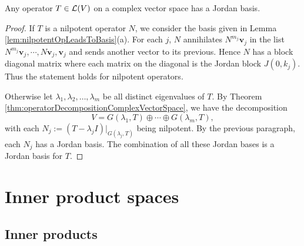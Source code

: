 \begin{thm}[Jordan]
  \label{thm:JordanBasis}
  Any operator $T\in{\cal L}(V)$ on a complex vector space
  has a Jordan basis.
\end{thm}
\begin{proof}
  If $T$ is a nilpotent operator $N$,
  we consider the basis given in
  Lemma \ref{lem:nilpotentOpLeadsToBasis}(a).
  For each $j$, $N$ annihilates
  $N^{m_j}\mathbf{v}_j$ in the list
  $N^{m_j}\mathbf{v}_j, \cdots, N\mathbf{v}_j, \mathbf{v}_j$
  and sends another vector to its previous.
  Hence
  $N$ has a block diagonal matrix where each matrix
  on the diagonal is the Jordan block $J(0,k_j)$.
  Thus the statement holds for nilpotent operators.
  
  Otherwise let $\lambda_1, \lambda_2, \ldots, \lambda_m$
  be all distinct eigenvalues of $T$.
  By Theorem \ref{thm:operatorDecompositionComplexVectorSpace},
  we have the decomposition
  \begin{displaymath}
    V=G(\lambda_1,T)\oplus \cdots \oplus G(\lambda_m, T),
  \end{displaymath}
  with each $N_j:=(T-\lambda_jI)|_{G(\lambda_j, T)}$ being nilpotent.
  By the previous paragraph, each $N_j$ has a Jordan basis.
  The combination of all these Jordan bases is a Jordan basis for $T$.
\end{proof}


\section{Inner product spaces}
\label{sec:inner-product-spaces}

\subsection{Inner products}
\label{sec:inner-products-norms}

